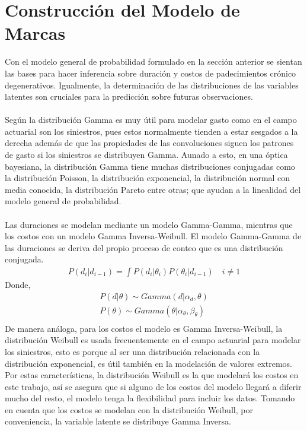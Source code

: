 \section{Construcci\'on del Modelo de Marcas}
Con el modelo general de probabilidad formulado en la secci\'on anterior se sientan las bases para hacer inferencia sobre duraci\'on y costos de padecimientos cr\'onico degenerativos. Igualmente, la determinaci\'on de las distribuciones de las variables latentes son cruciales para la predicci\'on sobre futuras observaciones.\\
\\
Seg\'un \cite{fader2013gamma} la distribuci\'on Gamma es muy \'util para modelar gasto como en el campo actuarial son los siniestros, pues estos normalmente tienden a estar sesgados a la derecha adem\'as de que las propiedades de las convoluciones siguen los patrones de gasto si los siniestros se distribuyen Gamma. Aunado a esto, en una \'optica bayesiana, la distribuci\'on Gamma tiene muchas distribuciones conjugadas como la distribuci\'on Poisson, la distribuci\'on exponencial, la distribuci\'on normal con media conocida, la distribuci\'on Pareto entre otras; que ayudan a la linealidad del modelo general de probabilidad.\\
\\
Las duraciones se modelan mediante un modelo Gamma-Gamma, mientras que los costos con un modelo Gamma Inversa-Weibull. El modelo Gamma-Gamma de las duraciones se deriva del propio proceso de conteo que es una distribuci\'on conjugada.
\begin{align*}
P(d_i|d_{i-1})=\int P(d_i|\theta_i) P(\theta_i|d_{i-1}) \quad i \neq 1
\end{align*}
Donde,
\begin{align*}
P(d|\theta) \sim Gamma(d|\alpha_d,\theta)\\
P(\theta) \sim Gamma(\theta|\alpha_{\theta},\beta_\theta)\\
\end{align*}
De manera an\'aloga, para los costos el modelo es Gamma Inversa-Weibull, la distribuci\'on Weibull es usada frecuentemente en el campo actuarial para modelar los siniestros, esto es porque al ser una distribuci\'on relacionada con la distribuci\'on exponencial, es \'util tambi\'en en la modelaci\'on de valores extremos. Por estas caracter\'isticas, la distribuci\'on Weibull es la que modelar\'a los costos en este trabajo, as\'i se asegura que si alguno de los costos del modelo llegar\'a a diferir mucho del resto, el modelo tenga la flexibilidad para incluir los datos. Tomando en cuenta que los costos se modelan con la distribuci\'on Weibull, por conveniencia, la variable latente se distribuye Gamma Inversa.
